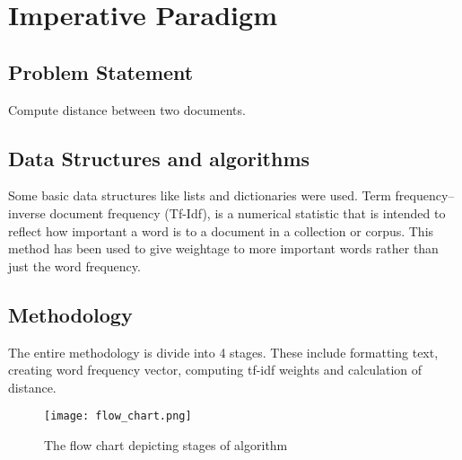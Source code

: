 \chapter{Imperative Paradigm}
\label{ch:p1}

\section{Problem Statement}
\label{sec:pm1}

Compute distance between two documents.

\section{Data Structures and algorithms}

Some basic data structures like lists and dictionaries were used. Term frequency–inverse document frequency (Tf-Idf), is a numerical statistic that is intended to reflect how important a word is to a document in a collection or corpus. This method has been used to give weightage to more important words rather than just the word frequency.


\section{Methodology}

The entire methodology is divide into 4 stages. These include formatting text, creating word frequency vector, computing tf-idf weights and calculation of distance. 

\begin{figure}[H]
	\centering
	\texttt{[image: flow\_chart.png]}\\
	\caption{The flow chart depicting stages of algorithm}
\end{figure}

